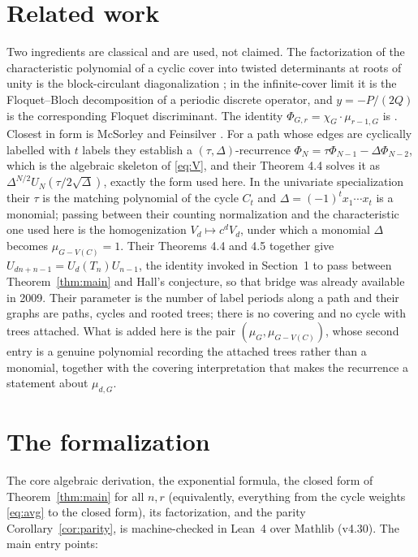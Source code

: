 \documentclass[11pt]{article}
\theoremstyle{remark}
\begin{document}
\section{Related work}
Two ingredients are classical and are used, not claimed. The factorization of
the characteristic polynomial of a cyclic cover into twisted determinants at
roots of unity is the block-circulant diagonalization
\cite{MS,DFMRS}; in the infinite-cover limit it is the Floquet--Bloch
decomposition of a periodic discrete operator, and $y=-P/(2Q)$ is the
corresponding Floquet discriminant. The identity
$\Phi_{G,r}=\chi_G\cdot\mu_{r-1,G}$ is \cite{HPS}. Closest in form is
McSorley and Feinsilver \cite{MF}. For a path whose edges are cyclically
labelled with $t$ labels they establish a $(\tau,\Delta)$-recurrence
$\Phi_{N}=\tau\Phi_{N-1}-\Delta\Phi_{N-2}$, which is the algebraic skeleton of
\eqref{eq:V}, and their Theorem 4.4 solves it as
$\Delta^{N/2}U_N(\tau/2\sqrt{\Delta})$, exactly the form used here. In the
univariate specialization their $\tau$ is the matching polynomial of the cycle
$C_t$ and $\Delta=(-1)^tx_1\cdots x_t$ is a monomial; passing between their
counting normalization and the characteristic one used here is the
homogenization $V_d\mapsto c^dV_d$, under which a monomial $\Delta$ becomes
$\mu_{G-V(C)}=1$. Their Theorems 4.4 and 4.5 together give
$U_{dn+n-1}=U_d(T_n)U_{n-1}$, the identity invoked in Section~1 to pass between
Theorem~\ref{thm:main} and Hall's conjecture, so that bridge was already
available in 2009. Their parameter is the number of label periods along a path
and their graphs are paths, cycles and rooted trees; there is no covering and
no cycle with trees attached. What is added here is the pair
$(\mu_G,\mu_{G-V(C)})$, whose second entry is a genuine polynomial recording
the attached trees rather than a monomial, together with the covering
interpretation that makes the recurrence a statement about $\mu_{d,G}$.


\section{The formalization}

The core algebraic derivation, the exponential formula, the closed form of
Theorem~\ref{thm:main} for all $n,r$ (equivalently, everything from the cycle
weights \eqref{eq:avg} to the closed form), its factorization, and the parity
Corollary~\ref{cor:parity}, is machine-checked in Lean~4 over Mathlib (v4.30).
The main entry points:
\end{document}
